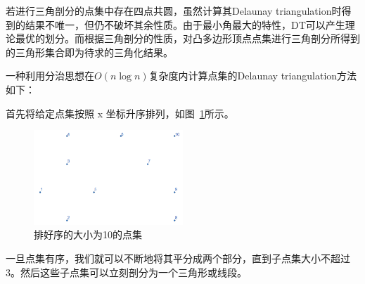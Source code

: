 若进行三角剖分的点集中存在四点共圆，虽然计算其Delaunay triangulation时得到的结果不唯一，但仍不破坏其余性质。由于最小角最大的特性，DT可以产生理论最优的划分。而根据三角剖分的性质，对凸多边形顶点点集进行三角剖分所得到的三角形集合即为待求的三角化结果。

一种利用分治思想在\(O(n\log n)\)复杂度内计算点集的Delaunay triangulation方法如下：

首先将给定点集按照 x 坐标升序排列，如图~\ref*{DT1}所示。

\begin{figure}[htbp]
    \centering
    \includegraphics[width=0.5\textwidth]
    {figures/DT1.png}
    \caption{排好序的大小为10的点集}
    \label{DT1}
\end{figure}
\newpage
一旦点集有序，我们就可以不断地将其平分成两个部分，直到子点集大小不超过 3。然后这些子点集可以立刻剖分为一个三角形或线段。

